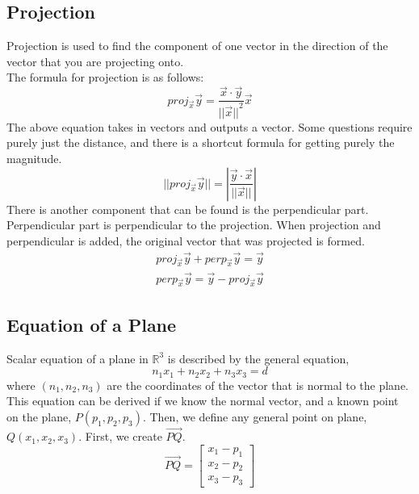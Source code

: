 \documentclass[12pt]{article}
\newcommand{\R}{\mathbb{R}}
\newcommand{\vectorproj}[2][]{\textit{proj}_{\vec{#1}}\vec{#2}}
\newcommand{\vectorperp}[2][]{\textit{perp}_{\vec{#1}}\vec{#2}}
\begin{document}
\subsection{Projection}
Projection is used to find the component of one vector in the direction of the vector that you are projecting onto.\\
The formula for projection is as follows:
\begin{equation}
\vectorproj[x]{y} = \frac{\vec{x}\cdot\vec{y}}{{||\vec{x}||}^2}\vec{x} 
\end{equation}
The above equation takes in vectors and outputs a vector. Some questions require purely just the distance, and there is a shortcut formula for getting purely the magnitude.
\begin{equation}
||\vectorproj[x]{y}|| = |\frac{\vec{y}\cdot\vec{x}}{||\vec{x}||}|
\end{equation}
There is another component that can be found is the perpendicular part. Perpendicular part is perpendicular to the projection. When projection and perpendicular is added, the original vector that was projected is formed.
\begin{equation}
\begin{split}
\vectorproj[x]{y} + \vectorperp[x]{y} = \vec{y}\\
\vectorperp[x]{y} = \vec{y} - \vectorproj[x]{y}
\end{split}
\end{equation}



\subsection{Equation of a Plane}
Scalar equation of a plane in $\R^3$ is described by the general equation, 
\begin{equation}
n_1x_1 + n_2x_2 +n_3x_3 = d
\end{equation}
where $(n_1,n_2,n_3)$ are the coordinates of the vector that is normal to the plane.\\
This equation can be derived if we know the normal vector, and a known point on the plane, $P(p_1,p_2,p_3)$. Then, we define any general point on plane, $Q(x_1,x_2,x_3)$.
First, we create $\vec{PQ}$.
\begin{equation}
\vec{PQ} = \begin{bmatrix}x_1-p_1\\x_2-p_2\\x_3-p_3\end{bmatrix}
\end{equation}
\end{document}
